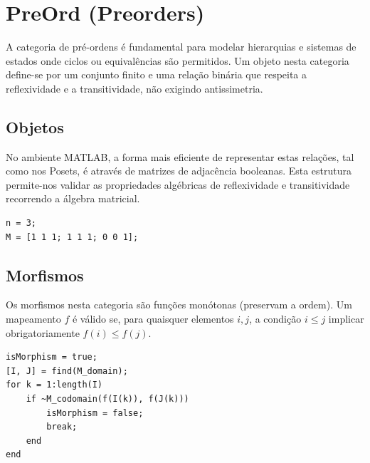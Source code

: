 \section{PreOrd (Preorders)}
A categoria de pré-ordens é fundamental para modelar hierarquias e sistemas de estados onde ciclos ou equivalências são permitidos.
Um objeto nesta categoria define-se por um conjunto finito e uma relação binária que respeita a reflexividade e a transitividade, não exigindo antissimetria.

\subsection{Objetos}
No ambiente MATLAB, a forma mais eficiente de representar estas relações, tal como nos Posets, é através de matrizes de adjacência booleanas.
Esta estrutura permite-nos validar as propriedades algébricas de reflexividade e transitividade recorrendo a álgebra matricial.

\begin{lstlisting}[caption={Representação de uma Pré-ordem (1 e 2 são equivalentes, 3 é maior)}]
% Matriz de adjacência para uma pré-ordem
n = 3;
M = [1 1 1; 1 1 1; 0 0 1];
\end{lstlisting}

\subsection{Morfismos}
Os morfismos nesta categoria são funções monótonas (preservam a ordem).
Um mapeamento $f$ é válido se, para quaisquer elementos $i, j$, a condição $i \le j$ implicar obrigatoriamente $f(i) \le f(j)$.

\begin{lstlisting}[caption={Algoritmo de Verificação de Monotonia para PreOrd}]
% f é um vetor onde o índice é o domínio e o valor é a imagem
isMorphism = true;
[I, J] = find(M_domain);
for k = 1:length(I)
    if ~M_codomain(f(I(k)), f(J(k)))
        isMorphism = false;
        break;
    end
end
\end{lstlisting}